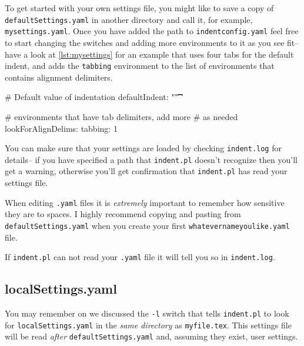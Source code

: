  	To get started with your own settings file, you might like to save a copy of 
 	\lstinline!defaultSettings.yaml! in another directory and call it, for 
 	example, \lstinline!mysettings.yaml!. Once you have added the path to \lstinline!indentconfig.yaml!
 	feel free to start changing the switches and adding more environments to it 
 	as you see fit-- have a look at \cref{lst:mysettings} for an example 
 	that uses four tabs for the default indent, and adds the \lstinline!tabbing!
 	environment to the list of environments that contains alignment delimiters.
 	 	 	 	 	
 	\begin{yaml}[caption={\lstinline!mysettings.yaml! (example)},label={lst:mysettings}]
# Default value of indentation
defaultIndent: "\t\t\t\t"

# environments that have tab delimiters, add more 
# as needed
lookForAlignDelims:
   tabbing: 1
 	\end{yaml}
 	 	 	 	 	
 	You can make sure that your settings are loaded by checking \lstinline!indent.log!
 	for details-- if you have specified a path that \lstinline!indent.pl! doesn't 
 	recognize then you'll get a warning, otherwise you'll get confirmation that 
 	\lstinline!indent.pl! has read your settings file.
 	 	 	 	 	
 	 	 	 	 	
 	\begin{warning}
 		When editing \lstinline!.yaml! files it is \emph{extremely} important 
 		to remember how sensitive they are to spaces. I highly recommend copying 
 		and pasting from \lstinline!defaultSettings.yaml! when you create your
 		first \lstinline!whatevernameyoulike.yaml! file.

        If \lstinline!indent.pl! can not read your \lstinline!.yaml! file it 
        will tell you so in \lstinline!indent.log!.
 	\end{warning}
 	 	 	 	 	
 \subsection{localSettings.yaml}
 	You may remember on  we discussed the \lstinline!-l! switch
 	that tells \lstinline!indent.pl! to look for \lstinline!localSettings.yaml! in the 
 	\emph{same directory} as \lstinline!myfile.tex!. This settings file will 
 	be read \emph{after} \lstinline!defaultSettings.yaml! and, assuming they exist, 
 	user settings. 
 	 	 	 	 	
